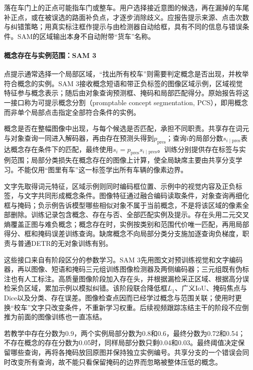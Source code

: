 落在车门上的正点可能指车门或整车。用户选择接近意图的候选，再在漏掉的车尾补正点，或在被误选的路面补负点，才逐步消除歧义。应报告提示来源、点击次数与纠错策略；用真实标注框作提示与由检测器自动给框，具有不同的信息与错误条件。SAM的区域输出本身不自动附带“货车”名称。

\paragraph{概念存在与实例范围：SAM 3}
\label{sec:vision-recognition-sam3}

点提示通常选择一个局部区域，“找出所有校车”则需要判定概念是否出现，并枚举符合概念的实例。SAM 3接收概念短语和带正负标签的图像区域示例，区域视觉特征参与概念表示；随后由对象查询预测框、掩码和局部匹配得分。原始报告将这一接口称为可提示概念分割（promptable concept segmentation, PCS），即用概念而非单个局部点击指定全部符合条件的实例。

概念是否在整幅图像中出现，与每个候选是否匹配，承担不同职责。共享存在词元与对象查询一同进入解码器，再由存在预测头得到$p_{\mathrm{pres}}$；查询$i$的局部分数$s_{i\mid\mathrm{pres}}$表达概念存在条件下的匹配，最终使用$s_i=p_{\mathrm{pres}}s_{i\mid\mathrm{pres}}$。训练分别提供存在标签与实例范围；局部分类损失在概念存在的图像上计算，使全局缺席主要由共享分支学习。不能仅用“图里有车”这一标签学出所有车辆的像素边界。

文字先取得词元特征，区域示例则同时编码框位置、示例中的视觉内容及正负标签，与文字共同形成概念条件。图像特征通过融合编码读取条件，对象查询再细化框与掩码；负示例告诉模型哪些相似对象不属于当前概念，不是将该区域的像素全部删除。训练记录包含概念、存在与否、全部匹配实例及提示。存在头用二元交叉熵覆盖正图与难负概念；概念存在时，实例按类别和范围代价唯一匹配，再用局部得分、框和掩码误差训练查询。缺席概念不向局部分类分支施加逐查询负梯度，职责与普通DETR的无对象训练有别。

这些接口来自有阶段区分的参数学习。SAM 3先用图文对预训练视觉和文字编码器，再以图像、短语和掩码三元组训练图像检测器及两侧编码器；三元组既有伪标注也有人工标注。高质量图像阶段加入存在头，并根据漏检采正区域、根据高分误检采负区域，累加示例以模拟纠错。该阶段联合降低框$L_1$、广义IoU、掩码焦点与Dice以及分类、存在误差。图像检查点因而已经学过概念与范围关联；使用时更换“校车”文字只改变条件，不重新学习权重。后续视频跟踪冻结主干的阶段不应倒推为前面的图像训练也一直冻结。

若教学中存在分数为0.9，两个实例局部分数为0.8和0.6，最终分数为0.72和0.54；不存在概念的存在分数为0.05时，同样局部分数只剩0.04和0.03。最终阈值决定保留哪些查询，再将各掩码放回原图并保持独立实例编号。共享分支的一个错误会同时改变所有查询，故不能只看保留掩码的边界而忽略被整体压低的概念。

